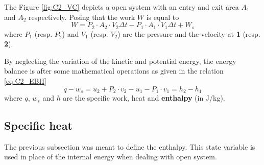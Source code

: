 The Figure \ref{fig:C2_VC} depicts a open system with an entry and exit area $A_1$ and $A_2$ respectively. Posing that the work $W$ is equal to 
\begin{equation}
W = P_2\cdot A_2\cdot V_2\Delta t - P_1\cdot A_1\cdot V_1\Delta t + W_s
\end{equation}      
where $P_1$ (resp. $P_2$) and $V_1$ (resp. $V_2$) are the pressure and the velocity at \textbf{1} (resp. \textbf{2}).

By neglecting the variation of the kinetic and potential energy, the energy balance is after some mathematical operations as given in the relation \ref{eq:C2_EBH}
\begin{equation}
q - w_s = u_2 +P_2\cdot v_2 - u_1 - P_1\cdot v_1 = h_2 - h_1
\end{equation}
where $q$, $w_s$ and $h$ are the specific work, heat and \textbf{enthalpy} (in J/kg).  

\subsection{Specific heat}
The previous subsection was meant to define the enthalpy. This state variable is used in place of the internal energy when dealing with open system.

  
